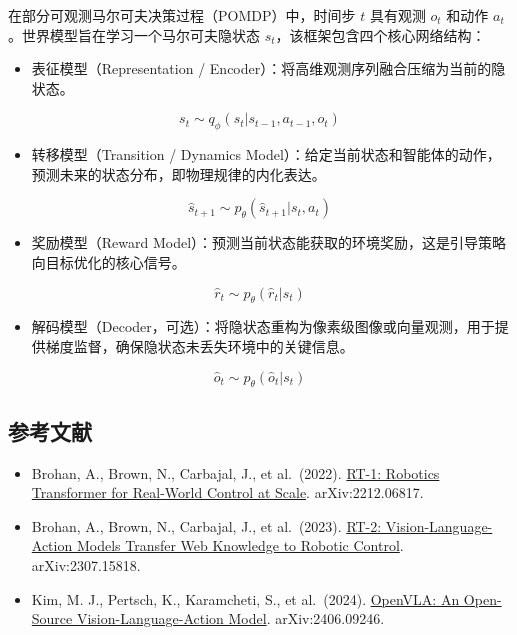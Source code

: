 在部分可观测马尔可夫决策过程（POMDP）中，时间步 \(t\) 具有观测 \(o_t\) 和动作 \(a_t\)。世界模型旨在学习一个马尔可夫隐状态 \(s_t\)，该框架包含四个核心网络结构：

\begin{itemize}
\tightlist
\item
  表征模型（Representation / Encoder）：将高维观测序列融合压缩为当前的隐状态。
\end{itemize}

\[
s_t\sim q_\phi(s_t|s_{t-1},a_{t-1},o_t)
\]

\begin{itemize}
\tightlist
\item
  转移模型（Transition / Dynamics Model）：给定当前状态和智能体的动作，预测未来的状态分布，即物理规律的内化表达。
\end{itemize}

\[
\hat{s}_{t+1}\sim p_\theta(\hat{s}_{t+1}|s_t,a_t)
\]

\begin{itemize}
\tightlist
\item
  奖励模型（Reward Model）：预测当前状态能获取的环境奖励，这是引导策略向目标优化的核心信号。
\end{itemize}

\[
\hat{r}_t\sim p_\theta(\hat{r}_t|s_t)
\]

\begin{itemize}
\tightlist
\item
  解码模型（Decoder，可选）：将隐状态重构为像素级图像或向量观测，用于提供梯度监督，确保隐状态未丢失环境中的关键信息。
\end{itemize}

\[
\hat{o}_t\sim p_\theta(\hat{o}_t|s_t)
\]

\hypertarget{ux53c2ux8003ux6587ux732e-171}{%
\subsection{参考文献}\label{ux53c2ux8003ux6587ux732e-171}}

\begin{itemize}
\tightlist
\item
  Brohan, A., Brown, N., Carbajal, J., et al.~(2022). \href{https://arxiv.org/abs/2212.06817}{RT-1: Robotics Transformer for Real-World Control at Scale}. arXiv:2212.06817.
\item
  Brohan, A., Brown, N., Carbajal, J., et al.~(2023). \href{https://arxiv.org/abs/2307.15818}{RT-2: Vision-Language-Action Models Transfer Web Knowledge to Robotic Control}. arXiv:2307.15818.
\item
  Kim, M. J., Pertsch, K., Karamcheti, S., et al.~(2024). \href{https://arxiv.org/abs/2406.09246}{OpenVLA: An Open-Source Vision-Language-Action Model}. arXiv:2406.09246.
\end{itemize}

